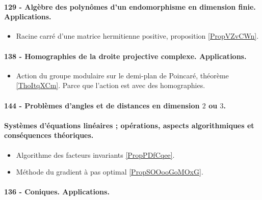 \paragraph{129 - Algèbre des polynômes d'un endomorphisme en dimension finie. Applications.}
\begin{itemize}
    \item Racine carré d'une matrice hermitienne positive, proposition \ref{PropVZvCWn}.
\end{itemize}
\paragraph{138 - Homographies de la droite projective complexe. Applications.}
\begin{itemize}
    \item Action du groupe modulaire sur le demi-plan de Poincaré, théorème \ref{ThoItqXCm}. Parce que l'action est avec des homographies.
\end{itemize}
\paragraph{144 - Problèmes d’angles et de distances en dimension $2$ ou $3$.}
\paragraph{Systèmes d'équations linéaires ; opérations, aspects algorithmiques et conséquences théoriques.}
\begin{itemize}
    \item Algorithme des facteurs invariants \ref{PropPDfCqee}.
    \item Méthode du gradient à pas optimal \ref{PropSOOooGoMOxG}.
\end{itemize}
\paragraph{136 - Coniques. Applications.}
